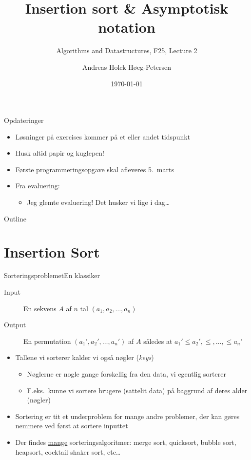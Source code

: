 \documentclass[aspectratio=1610]{beamer}
\title[ALG25 - Lecture 2]
{Insertion sort \& Asymptotisk notation}
\subtitle
{Algorithms and Datastructures, F25, Lecture 2}
\author[Andreas H. Høeg-Petersen]
{Andreas Holck Høeg-Petersen}
\institute[AAU]{%
  Department of Computer Science\\
  Aalborg University
}
\date {\today}
\begin{document}
\begin{frame}
  \titlepage
\end{frame}

\begin{frame}{Opdateringer}{}
    \begin{itemize}[<+->]
        \item Løsninger på exercises kommer på et eller andet tidspunkt
        \item Husk altid papir og kuglepen!
        \item Første programmeringsopgave skal afleveres 5.\ marts
        \item Fra evaluering:
            \begin{itemize}
                \item Jeg glemte evaluering! Det husker vi lige i dag\ldots
            \end{itemize}
    \end{itemize}
\end{frame}


\begin{frame}{Outline}
  \tableofcontents
\end{frame}


\section{Insertion Sort}

\begin{frame}{Sorteringsproblemet}{En klassiker}
    \begin{description}
        \item[Input] En sekvens $A$ af $n$ tal $(a_1, a_2, \ldots, a_n)$
        \item[Output] En permutation $(a_1', a_2', \ldots, a_n')$ af $A$ således
            at $a_1' \leq a_2', \leq, \ldots, \leq a_n'$ \pause
    \end{description}

    \begin{itemize}[<+->]
        \item Tallene vi sorterer kalder vi også \alert{nøgler} (\textit{keys})
            \begin{itemize}
                \item Nøglerne er nogle gange forskellig fra den data, vi
                    egentlig sorterer
                \item F.eks.\ kunne vi sortere brugere (\alert{sattelit data})
                    på baggrund af deres alder (\alert{nøgler})
            \end{itemize}
        \item Sortering er tit et underproblem for mange andre problemer, der
            kan gøres nemmere ved først at sortere inputtet
        \item Der findes \underline{mange} sorteringsalgoritmer: merge sort,
            quicksort, bubble sort, heapsort, cocktail shaker sort, etc\ldots
    \end{itemize}

\end{frame}
\end{document}
